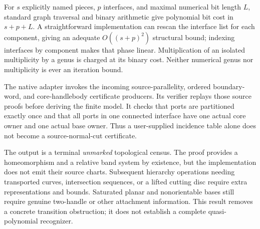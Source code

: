 For $s$ explicitly named pieces, $p$ interfaces, and maximal numerical
bit length $L$, standard graph traversal and binary arithmetic give
polynomial bit cost in $s+p+L$.  A straightforward implementation can
rescan the interface list for each component, giving an adequate
$O((s+p)^2)$ structural bound; indexing interfaces by component makes that
phase linear.  Multiplication of an isolated multiplicity by a genus is
charged at its binary cost.  Neither numerical genus nor multiplicity
is ever an iteration bound.

The native adapter invokes the incoming source-parallelity, ordered
boundary-word, and core-handlebody certificate producers.  Its verifier
replays those source proofs before deriving the finite model.  It checks
that ports are partitioned exactly once and that all ports in one
connected interface have one actual core owner and one actual base
owner.  Thus a user-supplied incidence table alone does not become a
source-normal-cut certificate.

The output is a terminal \emph{unmarked} topological census.  The proof
provides a homeomorphism and a relative band system by existence, but the
implementation does not emit their source charts.  Subsequent hierarchy
operations needing transported curves, intersection sequences, or a
lifted cutting disc require extra representations and bounds.  Saturated
planar and nonorientable bases still require genuine two-handle or other
attachment information.  This result removes a concrete transition
obstruction; it does not establish a complete quasi-polynomial recognizer.

